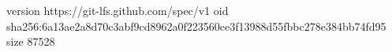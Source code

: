 version https://git-lfs.github.com/spec/v1
oid sha256:6a13ae2a8d70c3abf9cd8962a0f223560ce3f13988d55fbbc278e384bb74fd95
size 87528
